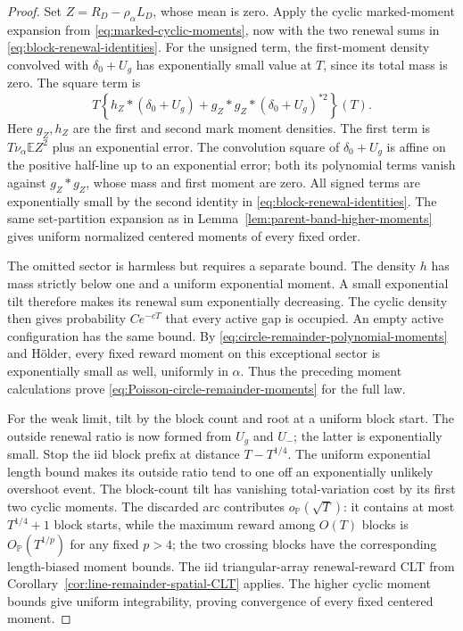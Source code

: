 \documentclass[11pt,letterpaper]{article}
\newcommand{\PP}{\mathbb P}\newcommand{\EE}{\mathbb E}
\begin{document}
\begin{proof}
Set $Z=R_D-\rho_\alpha L_D$, whose mean is zero. Apply the
cyclic marked-moment expansion from
\eqref{eq:marked-cyclic-moments}, now with the two renewal sums
in \eqref{eq:block-renewal-identities}. For the unsigned term,
the first-moment density convolved with $\delta_0+U_g$ has
exponentially small value at $T$, since its total mass is zero.
The square term is
\[
 T\left\{h_Z*(\delta_0+U_g)
       +g_Z*g_Z*(\delta_0+U_g)^{*2}\right\}(T).
\]
Here $g_Z,h_Z$ are the first and second mark moment densities.
The first term is $T\nu_\alpha\EE Z^2$ plus an exponential
error. The convolution square of $\delta_0+U_g$ is affine
on the positive half-line up to an exponential error; both
its polynomial terms vanish against $g_Z*g_Z$, whose mass
and first moment are zero. All signed terms are exponentially
small by the second identity in
\eqref{eq:block-renewal-identities}. The same set-partition
expansion as in Lemma~\ref{lem:parent-band-higher-moments}
gives uniform normalized centered moments of every fixed order.

The omitted sector is harmless but requires a separate bound.
The density $h$ has mass strictly below one and a uniform
exponential moment. A small exponential tilt therefore makes
its renewal sum exponentially decreasing. The cyclic density
then gives probability $Ce^{-cT}$ that every active gap is
occupied. An empty active configuration has the same bound.
By \eqref{eq:circle-remainder-polynomial-moments} and
H\"older, every fixed reward moment on this exceptional sector
is exponentially small as well, uniformly in $\alpha$.
Thus the preceding moment calculations prove
\eqref{eq:Poisson-circle-remainder-moments} for the full law.

For the weak limit, tilt by the block count and root at a
uniform block start. The outside renewal ratio is now formed
from $U_g$ and $U_-$; the latter is exponentially small.
Stop the iid block prefix at distance $T-T^{1/4}$.
The uniform exponential length bound makes its outside ratio
tend to one off an exponentially unlikely overshoot event.
The block-count tilt has vanishing total-variation cost by
its first two cyclic moments. The discarded arc contributes
$o_{\PP}(\sqrt T)$: it contains at most $T^{1/4}+1$ block
starts, while the maximum reward among $O(T)$ blocks is
$O_{\PP}(T^{1/p})$ for any fixed $p>4$; the two crossing
blocks have the corresponding length-biased moment bounds.
The iid triangular-array renewal-reward CLT from
Corollary~\ref{cor:line-remainder-spatial-CLT} applies.
The higher cyclic moment bounds give uniform integrability,
proving convergence of every fixed centered moment.
\end{proof}
\end{document}
